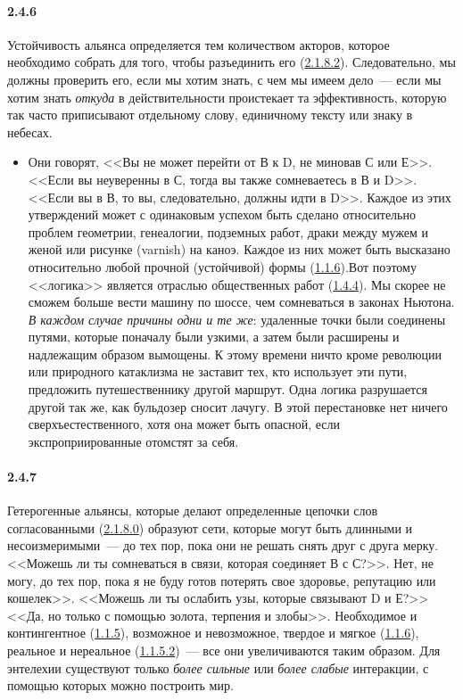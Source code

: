 \paragraph{2.4.6}\hypertarget{par:2.4.6}{} Устойчивость альянса определяется тем количеством акторов, которое необходимо собрать для того, чтобы разъединить его (\hyperlink{par:2.1.8.2}{2.1.8.2}). Следовательно, мы должны проверить его, если мы хотим знать, с чем мы имеем дело~--- если мы хотим знать {\itshape откуда} в действительности проистекает та эффективность, которую так часто приписывают отдельному слову, единичному тексту или знаку в небесах.
	\begin{itemize}
	\item 
	Они говорят, <<Вы не может перейти от В к D, не миновав С или Е>>. <<Если вы неуверенны в С, тогда вы также сомневаетесь в В и D>>. <<Если вы в В, то вы, следовательно, должны идти в D>>. Каждое из этих утверждений может с одинаковым успехом быть сделано относительно проблем геометрии, генеалогии, подземных работ, драки между мужем и женой или рисунке (varnish) на каноэ. Каждое из них может быть высказано относительно любой прочной (устойчивой) формы (\hyperlink{par:1.1.6}{1.1.6}).Вот поэтому <<логика>> является отраслью общественных работ (\hyperlink{par:1.4.4}{1.4.4}). Мы скорее не сможем больше вести машину по шоссе, чем сомневаться в законах Ньютона. {\itshape В каждом случае причины одни и те же}: удаленные точки были соединены путями, которые поначалу были узкими, а затем были расширены и надлежащим образом вымощены. К этому времени ничто кроме революции или природного катаклизма не заставит тех, кто использует эти пути, предложить путешественнику другой маршрут. Одна логика разрушается другой так же, как бульдозер сносит лачугу. В этой перестановке нет ничего сверхъестественного, хотя она может быть опасной, если экспроприированные отомстят за себя.
	\end{itemize}

\paragraph{2.4.7}\hypertarget{par:2.4.7}{} Гетерогенные альянсы, которые делают определенные цепочки слов согласованными (\hyperlink{par:2.1.8.0}{2.1.8.0}) образуют сети, которые могут быть длинными и несоизмеримыми~--- до тех пор, пока они не решать снять друг с друга мерку. <<Можешь ли ты сомневаться в связи, которая соединяет В с С?>>. Нет, не могу, до тех пор, пока я не буду готов потерять свое здоровье, репутацию или кошелек>>. <<Можешь ли ты ослабить узы, которые связывают D и Е?>> <<Да, но только с помощью золота, терпения и злобы>>. Необходимое и контингентное (\hyperlink{par:1.1.5}{1.1.5}), возможное и невозможное, твердое и мягкое (\hyperlink{par:1.1.6}{1.1.6}), реальное и нереальное (\hyperlink{par:1.1.5.2}{1.1.5.2})~--- все они увеличиваются таким образом. Для энтелехии существуют только {\itshape более сильные} или {\itshape более слабые} интеракции, с помощью которых можно построить мир.

